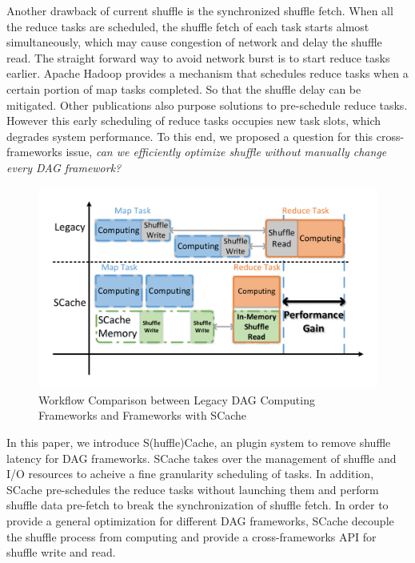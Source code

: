Another drawback of current shuffle is the synchronized shuffle fetch. When all the reduce tasks are scheduled, the shuffle fetch of each task starts almost simultaneously, which may cause congestion of network and delay the shuffle read. The straight forward way to avoid network burst is to start reduce tasks earlier. Apache Hadoop\cite{hadoop} provides a mechanism that schedules reduce tasks when a certain portion of map tasks completed. So that the shuffle delay can be mitigated. Other publications also purpose solutions to pre-schedule reduce tasks\cite{ihadoop, ishuffle, dynmr}. However this early scheduling of reduce tasks occupies new task slots, which degrades system performance. To this end, we proposed a question for this cross-frameworks issue, \textit{can we efficiently optimize shuffle without manually change every DAG framework?} 

\begin{figure}
	\centering
	\includegraphics[width=\linewidth]{fig/workflow}
	\caption{Workflow Comparison between Legacy DAG Computing Frameworks and Frameworks with SCache}
	\label{fig:workflow}
\end{figure}




In this paper, we introduce S(huffle)Cache, an plugin system to remove shuffle latency for DAG frameworks. SCache takes over the management of shuffle and I/O resources to acheive a fine granularity scheduling of tasks. In addition, SCache pre-schedules the reduce tasks without launching them and perform shuffle data pre-fetch to break the synchronization of shuffle fetch. In order to provide a general optimization for different DAG frameworks, SCache decouple the shuffle process from computing and  provide a cross-frameworks API for shuffle write and read. 


